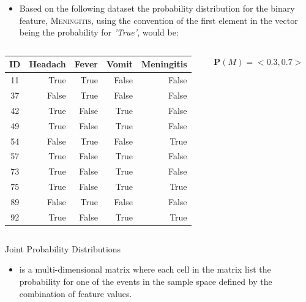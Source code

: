 \documentclass[xcolor={table}]{beamer}
\newcommand{\featN}[1]{\textsc{#1}}
\newcommand{\featL}[1]{\textit{'#1'}}
\begin{document}
\begin{frame}
\begin{example}
\begin{itemize}
	\item Based on the following dataset the probability distribution for the binary feature, \featN{Meningitis}, using the convention of the first element in the vector being the probability for \featL{True}, would be: 
\end{itemize}
 \begin{columns}
\begin{column}{0.6\textwidth}
\begin{footnotesize}
\begin{tabular}{crrrr}
\hline
\textbf{ID} & \textbf{Headach} & \textbf{Fever} & \textbf{Vomit} & \textbf{Meningitis}\\
\hline
11 & True & True & False & False\\
37 & False & True & False & False\\
42 & True & False & True & False\\
49 & True & False & True & False\\
54 & False & True & False & True\\
57 & True & False & True & False\\
73 & True & False & True & False\\
75 & True & False & True & True\\
89 & False & True & False & False\\
92 & True & False & True & True\\
\hline
\end{tabular}
\end{footnotesize}
\end{column}
\begin{column}{0.4\textwidth}
	\begin{center}
	 $\mathbf{P}(M)=<0.3,0.7>$
	\end{center}
\end{column}
\end{columns}
\end{example}
\end{frame}

\begin{frame}
\begin{alertblock}{Joint Probability Distributions}
\begin{itemize}
	\item is a multi-dimensional matrix where each cell in the matrix list the probability for one of the events in the sample space defined by the combination of feature values. 
	\end{itemize}
\end{alertblock}
\end{frame}
\end{document}
